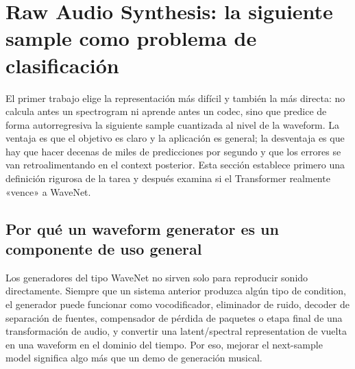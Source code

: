\section{Raw Audio Synthesis: la siguiente sample como problema de clasificación}

El primer trabajo elige la representación más difícil y también la más directa: no calcula antes un spectrogram ni aprende antes un codec, sino que predice de forma autorregresiva la siguiente sample cuantizada al nivel de la waveform. La ventaja es que el objetivo es claro y la aplicación es general; la desventaja es que hay que hacer decenas de miles de predicciones por segundo y que los errores se van retroalimentando en el context posterior. Esta sección establece primero una definición rigurosa de la tarea y después examina si el Transformer realmente «vence» a WaveNet.


\subsection{Por qué un waveform generator es un componente de uso general}

Los generadores del tipo WaveNet no sirven solo para reproducir sonido directamente. Siempre que un sistema anterior produzca algún tipo de condition, el generador puede funcionar como vocodificador, eliminador de ruido, decoder de separación de fuentes, compensador de pérdida de paquetes o etapa final de una transformación de audio, y convertir una latent/spectral representation de vuelta en una waveform en el dominio del tiempo. Por eso, mejorar el next-sample model significa algo más que un demo de generación musical.



